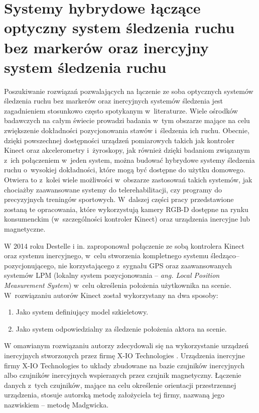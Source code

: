 \section{Systemy hybrydowe łączące optyczny system śledzenia ruchu bez markerów oraz inercyjny system śledzenia ruchu} \label{sec:literature:hybrids}
Poszukiwanie rozwiązań pozwalających na łączenie ze soba optycznych systemów śledzenia ruchu bez markerów oraz inercyjnych systemów śledzenia jest zagadnieniem stosunkowo często spotykanym w~literaturze. Wiele ośrodków badawczych na całym świecie prowadzi badania w~tym obszarze mające na celu zwiększenie dokładności pozycjonowania stawów i~śledzenia ich ruchu. Obecnie, dzięki powszechnej dostępności urządzeń pomiarowych takich jak kontroler Kinect oraz akcelerometry i~żyroskopy, jak również dzięki badaniom związanym z~ich połączeniem w~jeden system, można budować hybrydowe systemy śledzenia ruchu o~wysokiej dokładności, które mogą być dostępne do użytku domowego. Otwiera to z~kolei wiele możliwości w~obszarze zastosowań takich systemów, jak chociażby zaawansowane systemy do telerehabilitacji, czy programy do precyzyjnych treningów sportowych. W~dalszej części pracy przedstawione zostaną te opracowania, które wykorzystują kamery RGB-D dostępne na rynku konsumenckim (w~szczególności kontroler Kinect) oraz urządzenia inercyjne lub magnetyczne. 

W 2014 roku Destelle i in. \cite{Destelle2014} zaproponował połączenie ze sobą kontrolera Kinect oraz systemu inercyjnego, w~celu stworzenia kompletnego systemu śledząco--pozycjonującego, nie korzystającego z~sygnału GPS oraz zaawansowanych systemów LPM (lokalny system pozycjonowania -- \emph{ang. Local Position Measurement System}) w~celu określenia położenia użytkownika na scenie. W~rozwiązaniu autorów Kinect został wykorzystany na dwa sposoby:
\begin{enumerate}
	\item Jako system definiujący model szkieletowy.
	\item Jako system odpowiedzialny za śledzenie położenia aktora na scenie.
\end{enumerate}
																																																	
W omawianym rozwiązaniu autorzy zdecydowali się na wykorzystanie urządzeń inercyjnych stworzonych przez firmę X-IO Technologies . Urządzenia inercyjne firmy X-IO Technologies to układy zbudowane na bazie czujników inercyjnych albo czujników inercyjnych wspieranych przez czujnik magnetyczny. Łączenie danych z~tych czujników, mające na celu określenie orientacji przestrzennej urządzenia, stosuje autorską metodę założyciela tej firmy, nazwaną jego nazwiskiem -- metodę Madgwicka.

